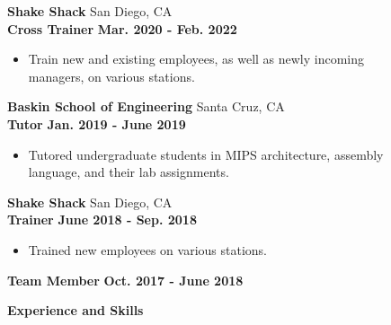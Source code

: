 \documentclass[a4paper]{article}
\newcommand{\lineunder} {
    \vspace*{-8pt} \\
    \hspace*{-18pt} \hrulefill \\
}
\newcommand{\header} [1] {
    {\hspace*{-18pt}\vspace*{6pt}\LARGE \textbf{#1}}
    \vspace*{-6pt} \lineunder
}
\begin{document}
\textbf{Shake Shack} \hfill San Diego, CA\\
\hspace{4mm} \textbf{Cross Trainer} \hfill \textbf{Mar. 2020 - Feb. 2022}\\
\vspace{-2mm}
\begin{itemize} \itemsep 1pt
	\item Train new and existing employees, as well as newly incoming\\ managers, on various stations.
\end{itemize}

\textbf{Baskin School of Engineering} \hfill Santa Cruz, CA\\
\hspace{4mm} \textbf{Tutor} \hfill \textbf{Jan. 2019 - June 2019}\\
\vspace{-2mm}
\begin{itemize} \itemsep 1pt
	\item Tutored undergraduate students in MIPS architecture, assembly\\language, and their lab assignments.
\end{itemize}

\textbf{Shake Shack} \hfill San Diego, CA\\
\hspace{4mm} \textbf{Trainer} \hfill \textbf{June 2018 - Sep. 2018}\\
\vspace{-2mm}
\begin{itemize} \itemsep 1pt
	\item Trained new employees on various stations.
\end{itemize}

\hspace{4mm} \textbf{Team Member} \hfill \textbf{Oct. 2017 - June 2018}\\
\vspace{3mm}
\header{Experience and Skills}
\vspace{1mm}
\end{document}
